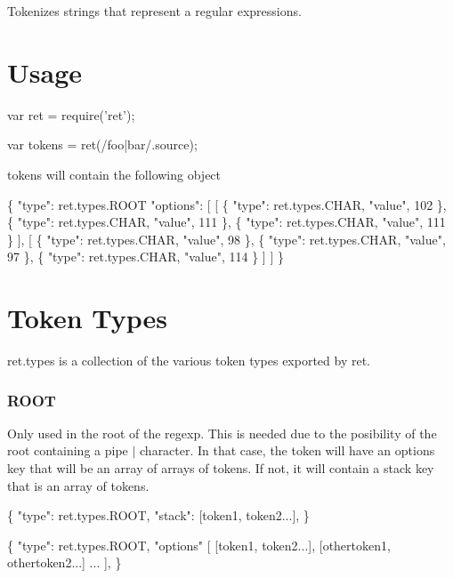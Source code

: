 Tokenizes strings that represent a regular expressions.

\href{http://travis-ci.org/fent/ret.js}{\tt } \href{https://david-dm.org/fent/ret.js}{\tt } \href{https://codecov.io/gh/fent/ret.js}{\tt }

\section*{Usage}


\begin{DoxyCode}
var ret = require('ret');

var tokens = ret(/foo|bar/.source);
\end{DoxyCode}


{\ttfamily tokens} will contain the following object


\begin{DoxyCode}
\{
  "type": ret.types.ROOT
  "options": [
    [ \{ "type": ret.types.CHAR, "value", 102 \},
      \{ "type": ret.types.CHAR, "value", 111 \},
      \{ "type": ret.types.CHAR, "value", 111 \} ],
    [ \{ "type": ret.types.CHAR, "value",  98 \},
      \{ "type": ret.types.CHAR, "value",  97 \},
      \{ "type": ret.types.CHAR, "value", 114 \} ]
  ]
\}
\end{DoxyCode}


\section*{Token Types}

{\ttfamily ret.\+types} is a collection of the various token types exported by ret.

\subsubsection*{R\+O\+OT}

Only used in the root of the regexp. This is needed due to the posibility of the root containing a pipe {\ttfamily $\vert$} character. In that case, the token will have an {\ttfamily options} key that will be an array of arrays of tokens. If not, it will contain a {\ttfamily stack} key that is an array of tokens.


\begin{DoxyCode}
\{
  "type": ret.types.ROOT,
  "stack": [token1, token2...],
\}
\end{DoxyCode}



\begin{DoxyCode}
\{
  "type": ret.types.ROOT,
  "options" [
    [token1, token2...],
    [othertoken1, othertoken2...]
    ...
  ],
\}
\end{DoxyCode}


